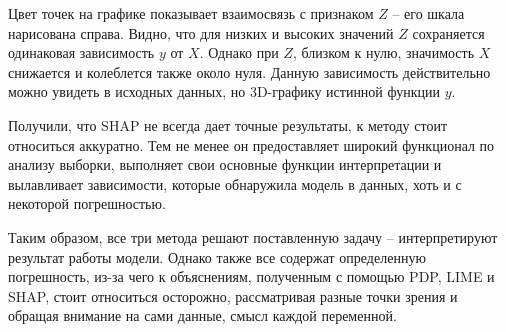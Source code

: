 Цвет точек на графике показывает взаимосвязь с признаком $Z$ -- его шкала нарисована справа. Видно, что для низких и высоких значений $Z$ сохраняется одинаковая зависимость $y$ от $X$. Однако при $Z$, близком к нулю, значимость $X$ снижается и колеблется также около нуля. Данную зависимость действительно можно увидеть в исходных данных, но 3D-графику истинной функции $y$.

Получили, что SHAP не всегда дает точные результаты, к методу стоит относиться аккуратно. Тем не менее он предоставляет широкий функционал по анализу выборки, выполняет свои основные функции интерпретации и вылавливает зависимости, которые обнаружила модель в данных, хоть и с некоторой погрешностью.

Таким образом, все три метода решают поставленную задачу -- интерпретируют результат работы модели. Однако также все содержат определенную погрешность, из-за чего к объяснениям, полученным с помощью PDP, LIME и SHAP, стоит относиться осторожно, рассматривая разные точки зрения и обращая внимание на сами данные, смысл каждой переменной.